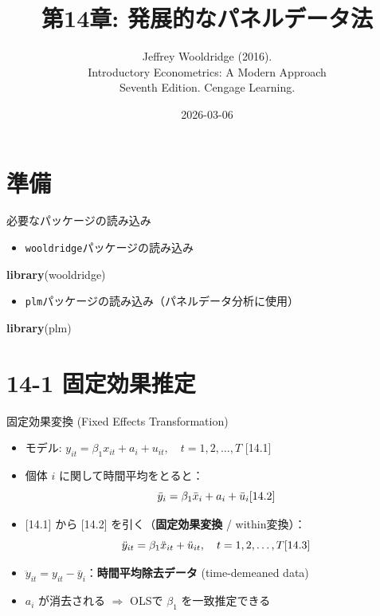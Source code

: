 \documentclass[
  ignorenonframetext,
]{beamer}
\title{第14章: 発展的なパネルデータ法}
\subtitle{Jeffrey Wooldridge (2016).\\
Introductory Econometrics: A Modern Approach\\
Seventh Edition. Cengage Learning.}
\author{}
\date{\vspace{-2.5em}2026-03-06}
\newenvironment{Shaded}{\begin{snugshade}}{\end{snugshade}}
\newcommand{\FunctionTok}[1]{\textcolor[rgb]{0.13,0.29,0.53}{\textbf{#1}}}
\newcommand{\NormalTok}[1]{#1}
\providecommand{\tightlist}{%
  \setlength{\itemsep}{0pt}\setlength{\parskip}{0pt}}
\begin{document}
\frame{\titlepage}

\section{準備}\label{ux6e96ux5099}

\begin{frame}[fragile]{必要なパッケージの読み込み}
\label{ux5fc5ux8981ux306aux30d1ux30c3ux30b1ux30fcux30b8ux306eux8aadux307fux8fbcux307f}
\begin{itemize}
\tightlist
\item
  \texttt{wooldridge}パッケージの読み込み
\end{itemize}

\begin{Shaded}
\begin{Highlighting}[]
\FunctionTok{library}\NormalTok{(wooldridge)}
\end{Highlighting}
\end{Shaded}

\begin{itemize}
\tightlist
\item
  \texttt{plm}パッケージの読み込み（パネルデータ分析に使用）
\end{itemize}

\begin{Shaded}
\begin{Highlighting}[]
\FunctionTok{library}\NormalTok{(plm)}
\end{Highlighting}
\end{Shaded}
\end{frame}

\section{14-1 固定効果推定}\label{ux56faux5b9aux52b9ux679cux63a8ux5b9a}

\begin{frame}{固定効果変換 (Fixed Effects Transformation)}
\label{ux56faux5b9aux52b9ux679cux5909ux63db-fixed-effects-transformation}
\begin{itemize}
\tightlist
\item
  モデル:
  \(y_{it} = \beta_1 x_{it} + a_i + u_{it}, \quad t = 1, 2, \dots, T\)
  \hfill {[}14.1{]}
\item
  個体 \(i\) に関して時間平均をとると：
  \[\bar{y}_i = \beta_1 \bar{x}_i + a_i + \bar{u}_i \hfill [14.2]\]
\item
  {[}14.1{]} から {[}14.2{]} を引く（\textbf{固定効果変換} /
  within変換）：
  \[\ddot{y}_{it} = \beta_1 \ddot{x}_{it} + \ddot{u}_{it}, \quad t = 1, 2, \dots, T \hfill [14.3]\]
\item
  \(\ddot{y}_{it} = y_{it} - \bar{y}_i\)：\textbf{時間平均除去データ}
  (time-demeaned data)
\item
  \(a_i\) が消去される \(\Rightarrow\) OLSで \(\beta_1\)
  を一致推定できる
\end{itemize}
\end{frame}
\end{document}
